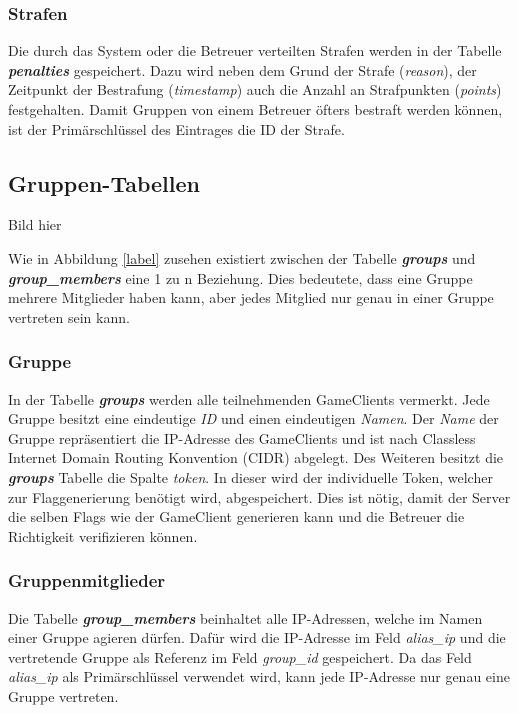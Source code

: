 \subsubsection{Strafen}
Die durch das System oder die Betreuer verteilten Strafen werden in der Tabelle \textbf{\textit{penalties}} gespeichert. Dazu wird neben dem Grund der Strafe (\textit{reason}), der Zeitpunkt der Bestrafung (\textit{timestamp}) auch die Anzahl an Strafpunkten (\textit{points}) festgehalten. Damit Gruppen von einem Betreuer öfters bestraft werden können, ist der Primärschlüssel des Eintrages die ID der Strafe.

\subsection{Gruppen-Tabellen}
Bild hier

Wie in Abbildung \ref{label} zusehen existiert zwischen der Tabelle \textbf{\textit{groups}} und \textbf{\textit{group\_members}} eine 1 zu n Beziehung. Dies bedeutete, dass eine Gruppe mehrere Mitglieder haben kann, aber jedes Mitglied nur genau in einer Gruppe vertreten sein kann.

\subsubsection{Gruppe}
In der Tabelle \textbf{\textit{groups}} werden alle teilnehmenden GameClients vermerkt. Jede Gruppe besitzt eine eindeutige \textit{ID} und einen eindeutigen \textit{Namen}. Der \textit{Name} der Gruppe repräsentiert die IP-Adresse des GameClients und ist nach Classless Internet Domain Routing Konvention (CIDR) abgelegt. Des Weiteren besitzt die \textbf{\textit{groups}} Tabelle die Spalte \textit{token}. In dieser wird der individuelle Token, welcher zur Flaggenerierung benötigt wird, abgespeichert. Dies ist nötig, damit der Server die selben Flags wie der GameClient generieren kann und die Betreuer die Richtigkeit verifizieren können.

\subsubsection{Gruppenmitglieder}
Die Tabelle \textbf{\textit{group\_members}} beinhaltet alle IP-Adressen, welche im Namen einer Gruppe agieren dürfen. Dafür wird die IP-Adresse im Feld \textit{alias\_ip} und die vertretende Gruppe als Referenz im Feld \textit{group\_id} gespeichert. Da das Feld \textit{alias\_ip} als Primärschlüssel verwendet wird, kann jede IP-Adresse nur genau eine Gruppe vertreten.

